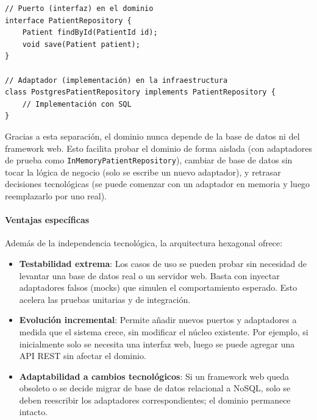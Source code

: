 \begin{verbatim}
// Puerto (interfaz) en el dominio
interface PatientRepository {
    Patient findById(PatientId id);
    void save(Patient patient);
}

// Adaptador (implementación) en la infraestructura
class PostgresPatientRepository implements PatientRepository {
    // Implementación con SQL
}
\end{verbatim}

Gracias a esta separación, el dominio nunca depende de la base de datos ni del 
framework web. Esto facilita probar el dominio de forma aislada (con adaptadores de prueba 
como \texttt{InMemoryPatientRepository}), cambiar de base de datos sin tocar la 
lógica de negocio (solo se escribe un nuevo adaptador), y retrasar decisiones tecnológicas
 (se puede comenzar con un adaptador en memoria y luego reemplazarlo por uno real).

\paragraph{Ventajas específicas}
Además de la independencia tecnológica, la arquitectura hexagonal ofrece:
\begin{itemize}
    \item \textbf{Testabilidad extrema}: Los casos de uso se pueden probar sin necesidad de levantar una base de datos real o un servidor web. Basta con inyectar adaptadores falsos (mocks) que simulen el comportamiento esperado. Esto acelera las pruebas unitarias y de integración.
    \item \textbf{Evolución incremental}: Permite añadir nuevos puertos y adaptadores a medida que el sistema crece, sin modificar el núcleo existente. Por ejemplo, si inicialmente solo se necesita una interfaz web, luego se puede agregar una API REST sin afectar el dominio.
    \item \textbf{Adaptabilidad a cambios tecnológicos}: Si un framework web queda obsoleto o se decide migrar de base de datos relacional a NoSQL, solo se deben reescribir los adaptadores correspondientes; el dominio permanece intacto.
\end{itemize}


